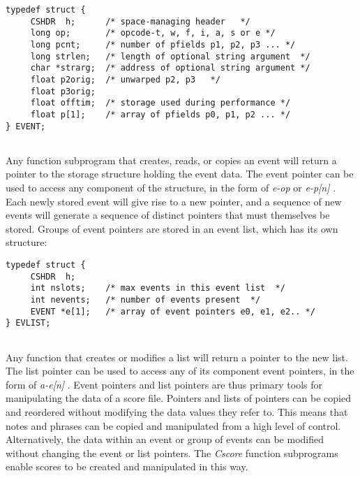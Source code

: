  


 
\begin{lstlisting}
typedef struct {
     CSHDR  h;      /* space-managing header   */
     long op;       /* opcode-t, w, f, i, a, s or e */
     long pcnt;     /* number of pfields p1, p2, p3 ... */
     long strlen;   /* length of optional string argument  */
     char *strarg;  /* address of optional string argument */
     float p2orig;  /* unwarped p2, p3   */
     float p3orig;
     float offtim;  /* storage used during performance */
     float p[1];    /* array of pfields p0, p1, p2 ... */
} EVENT;
      
\end{lstlisting}


 


  Any function subprogram that creates, reads, or copies an event will return a pointer to the storage structure holding the event data. The event pointer can be used to access any component of the structure, in the form of \emph{e-op}
 or \emph{e-p[n]}
. Each newly stored event will give rise to a new pointer, and a sequence of new events will generate a sequence of distinct pointers that must themselves be stored. Groups of event pointers are stored in an event list, which has its own structure: 


 
\begin{lstlisting}
typedef struct {
     CSHDR  h;
     int nslots;    /* max events in this event list  */
     int nevents;   /* number of events present  */
     EVENT *e[1];   /* array of event pointers e0, e1, e2.. */
} EVLIST;
      
\end{lstlisting}


 


  Any function that creates or modifies a list will return a pointer to the new list. The list pointer can be used to access any of its component event pointers, in the form of \emph{a-e[n]}
. Event pointers and list pointers are thus primary tools for manipulating the data of a score file. Pointers and lists of pointers can be copied and reordered without modifying the data values they refer to. This means that notes and phrases can be copied and manipulated from a high level of control. Alternatively, the data within an event or group of events can be modified without changing the event or list pointers. The \emph{Cscore}
 function subprograms enable scores to be created and manipulated in this way. 


